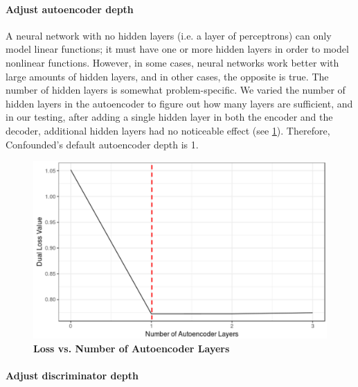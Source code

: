 \documentclass{article}
\begin{document}
\paragraph{Adjust autoencoder depth}

A neural network with no hidden layers (i.e. a layer of perceptrons) can only model linear functions;
it must have one or more hidden layers in order to model nonlinear functions.
However, in some cases, neural networks work better with large amounts of hidden layers, and in other cases, the opposite is true. %
The number of hidden layers is somewhat problem-specific.
We varied the number of hidden layers in the autoencoder to figure out how many layers are sufficient, and in our testing, after adding a single hidden layer in both the encoder and the decoder, additional hidden layers had no noticeable effect (see \figurename{} \ref{fig:ae}).
Therefore, Confounded's default autoencoder depth is 1.

\begin{figure}
	\centering
	\includegraphics[width=\columnwidth]{figures/supplement/ae_layers.png}
	\caption{\textbf{Loss vs. Number of Autoencoder Layers}
	}
	\label{fig:ae}
\end{figure}

\paragraph{Adjust discriminator depth}
\end{document}
